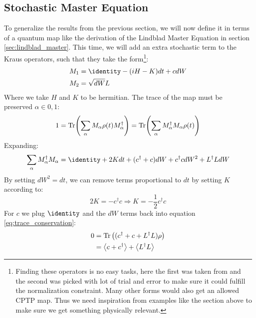 
\subsection{Stochastic Master Equation}
To generalize the results from the previous section, we will now define it in terms of a quantum map like the derivation of the Lindblad Master Equation in section \ref{sec:lindblad_master}. This time, we will add an extra stochastic term to the Kraus operators, such that they take the form\footnote{Finding these operators is no easy tasks, here the first was taken from \cite{jacobs_straightforward_2006} and the second was picked with lot of trial and error to make sure it could fulfill the normalization constraint. Many other forms would also get an allowed CPTP map. Thus we need inspiration from examples like the section above to make sure we get something physically relevant.}:
\begin{align}
    M_1      &=  \identity - (iH - K)dt + cdW \\
    M_2      &=  \sqrt{dW} L
\end{align}
Where we take $H$ and $K$ to be hermitian. The trace of the map must be preserved $\alpha \in {0, 1}$:
\begin{equation}
    1 = \Tr(\sum_\alpha M_\alpha \rho(t) M_\alpha^\dagger) = \Tr(\sum_\alpha M_\alpha^\dagger M_\alpha \rho(t))
\end{equation}
Expanding:
\begin{equation}\label{eq:trace_conservation}
    \sum_\alpha M_\alpha^\dagger M_\alpha = \identity + 2K dt +  (c^\dagger + c)dW + c^\dagger c dW^2 + L^\dagger L dW
\end{equation}
By setting $dW^2 = dt$, we can remove terms proportional to $dt$ by setting $K$ according to:
\begin{equation}
    2K = -c^\dagger c \Rightarrow K = -\frac12 c^\dagger c 
\end{equation}
For $c$ we plug $\identity$ and the $dW$ terms back into equation \ref{eq:trace_conservation}:
\begin{align}
    0 &= \Tr\left((c^\dagger + c + L^\dagger L)\rho \right) \\
      &= \expval{c + c^\dagger} + \expval{L^\dagger L}
\end{align}
